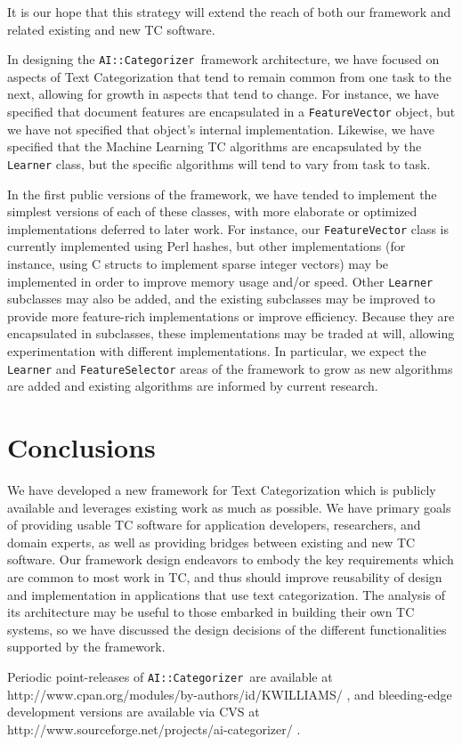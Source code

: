 \documentclass[twocolumn]{article}
\newcommand{\class}[1]{\texttt{#1}}
\newcommand{\aicat}{\texttt{AI::Cat\-e\-gor\-i\-zer}}
\begin{document}
It is our hope that this strategy will extend the reach of both our
framework and related existing and new TC software.

In designing the \aicat\ framework architecture, we have
focused on aspects of Text Categorization that tend to remain common
from one task to the next, allowing for growth in aspects that tend to
change.  For instance, we have specified that document features are
encapsulated in a \class{FeatureVector} object, but we have not specified that
object's internal implementation.  Likewise, we have specified that
the Machine Learning TC algorithms are encapsulated by the \class{Learner}
class, but the specific algorithms will tend to vary from task to
task.

In the first public versions of the framework, we have tended to
implement the simplest versions of each of these classes, with more
elaborate or optimized implementations deferred to later work.  For
instance, our \class{FeatureVector} class is currently implemented using Perl
hashes, but other implementations (for instance, using C structs to
implement sparse integer vectors) may be implemented in order to
improve memory usage and/or speed.  Other \class{Learner} subclasses may also
be added, and the existing subclasses may be improved to provide more
feature-rich implementations or improve efficiency.  Because they are
encapsulated in subclasses, these implementations may be traded at
will, allowing experimentation with different implementations.  In
particular, we expect the \class{Learner} and \class{FeatureSelector} areas of the
framework to grow as new algorithms are added and existing algorithms
are informed by current research.


\section{Conclusions}

We have developed a new framework for Text Categorization which is
publicly available and leverages existing work as much as possible.
We have primary goals of providing usable TC software for application
developers, researchers, and domain experts, as well as providing
bridges between existing and new TC software.  Our framework design
endeavors to embody the key requirements which are common to most work
in TC, and thus should improve reusability of design and
implementation in applications that use text categorization.  The
analysis of its architecture may be useful to those embarked in building
their own TC systems, so we have discussed the design decisions of the
different functionalities supported by the framework.

Periodic point-releases of \aicat\ are available at
http://www.cpan.org/modules/by-authors/id/KWILLIAMS/ , and
bleeding-edge development versions are available via CVS at
http://www.sourceforge.net/projects/ai-categorizer/ .




\end{document}
